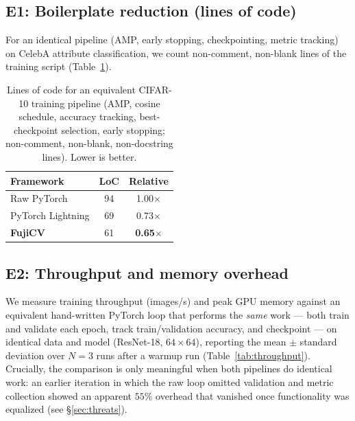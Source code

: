 \documentclass[11pt]{article}
\begin{document}
\subsection{E1: Boilerplate reduction (lines of code)}
\label{sec:e1}
For an identical pipeline (AMP, early stopping, checkpointing, metric tracking)
on CelebA attribute classification, we count non-comment, non-blank lines of the
training script (Table~\ref{tab:loc}).

\begin{table}[h]
\centering
\caption{Lines of code for an equivalent CIFAR-10 training pipeline (AMP, cosine
schedule, accuracy tracking, best-checkpoint selection, early stopping;
non-comment, non-blank, non-docstring lines). Lower is better.}
\label{tab:loc}
\small
\begin{tabular}{lcc}
\toprule
Framework & LoC & Relative \\
\midrule
Raw PyTorch       & 94 & 1.00$\times$ \\
PyTorch Lightning & 69 & 0.73$\times$ \\
\textbf{FujiCV}   & 61 & \textbf{0.65$\times$} \\
\bottomrule
\end{tabular}
\end{table}

\subsection{E2: Throughput and memory overhead}
\label{sec:e2}
We measure training throughput (images/s) and peak GPU memory against an
equivalent hand-written PyTorch loop that performs the \emph{same} work --- both
train and validate each epoch, track train/validation accuracy, and checkpoint ---
on identical data and model (ResNet-18, $64{\times}64$), reporting the mean $\pm$
standard deviation over $N{=}3$ runs after a warmup run
(Table~\ref{tab:throughput}). Crucially, the comparison is only meaningful when
both pipelines do identical work: an earlier iteration in which the raw loop
omitted validation and metric collection showed an apparent $55\%$ overhead that
vanished once functionality was equalized (see \S\ref{sec:threats}).
\end{document}
